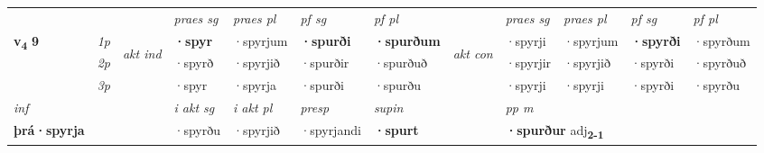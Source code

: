\begin{longtable}[l]{X>{\footnotesize\itshape}llXXXXlXXXX}
 & &   & \textit{praes sg}  & \textit{praes pl}    & \textit{ pf sg} & \textit{pf pl} & & \textit{praes sg}  & \textit{praes pl}    & \textit{pf sg} & \textit{pf pl }  \\ \cmidrule{4-7} \cmidrule{9-12}
 \multirow{2}{*}{{{\textbf{v{\textsubscript{4}}} \Large{\textbf{9}}}}}  & 1p & \multirow{3}{*}{\begin{turn}{90}\textit{akt ind}\end{turn}} & \textbf{·spyr} & ·spyrjum & \textbf{·spurði} & \textbf{·spurðum} & \multirow{3}{*}{\begin{turn}{90}\textit{akt con}\end{turn}} &·spyrji & ·spyrjum & \textbf{·spyrði} & ·spyrðum\\*
 & 2p &  &  ·spyrð  & ·spyrjið & ·spurðir & ·spurðuð & & ·spyrjir & ·spyrjið & ·spyrði & ·spyrðuð \\*
 & 3p &  & ·spyr & ·spyrja & ·spurði & ·spurðu & & ·spyrji & ·spyrji& ·spyrði & ·spyrðu \\*
\cmidrule{4-7} \cmidrule{9-12}

   {\textit{inf}} & &  & \textit{i akt sg} & \textit{i akt pl}   & \textit{presp} & \textit{supin}  && \textit{pp m} \\*
  {\textbf{þrá\allowbreak ·spyrja}} & && ·spyrðu  & ·spyrjið   & ·spyrjandi &  \textbf{·spurt}  && \multicolumn{2}{l}{\textbf{·spurður} adj\textbf{\textsubscript{2-1}}} \\*

\midrule


\end{longtable}
